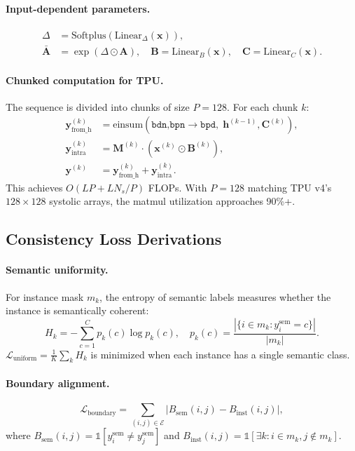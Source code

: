 \documentclass[10pt,twocolumn,letterpaper]{article}
\begin{document}
\paragraph{Input-dependent parameters.}
\begin{align}
\Delta &= \text{Softplus}(\text{Linear}_\Delta(\mathbf{x})), \\
\bar{\mathbf{A}} &= \exp(\Delta \odot \mathbf{A}), \quad \mathbf{B} = \text{Linear}_B(\mathbf{x}), \quad \mathbf{C} = \text{Linear}_C(\mathbf{x}).
\end{align}

\paragraph{Chunked computation for TPU.}
The sequence is divided into chunks of size $P = 128$. For each chunk $k$:
\begin{align}
\mathbf{y}_{\text{from\_h}}^{(k)} &= \text{einsum}(\texttt{bdn,bpn}\to\texttt{bpd},\; \mathbf{h}^{(k-1)}, \mathbf{C}^{(k)}), \\
\mathbf{y}_{\text{intra}}^{(k)} &= \mathbf{M}^{(k)} \cdot (\mathbf{x}^{(k)} \odot \mathbf{B}^{(k)}), \\
\mathbf{y}^{(k)} &= \mathbf{y}_{\text{from\_h}}^{(k)} + \mathbf{y}_{\text{intra}}^{(k)}.
\end{align}
This achieves $O(LP + LN_s/P)$ FLOPs. With $P = 128$ matching TPU v4's $128 \times 128$ systolic arrays, the matmul utilization approaches 90\%+.


\subsection{Consistency Loss Derivations}
\label{sec:supp_consistency}

\paragraph{Semantic uniformity.}
For instance mask $m_k$, the entropy of semantic labels measures whether the instance is semantically coherent:
\begin{equation}
H_k = -\sum_{c=1}^{C} p_k(c) \log p_k(c), \quad p_k(c) = \frac{|\{i \in m_k : y_i^{\text{sem}} = c\}|}{|m_k|}.
\end{equation}
$\mathcal{L}_{\text{uniform}} = \frac{1}{K}\sum_k H_k$ is minimized when each instance has a single semantic class.

\paragraph{Boundary alignment.}
\begin{equation}
\mathcal{L}_{\text{boundary}} = \sum_{(i,j) \in \mathcal{E}} |B_{\text{sem}}(i,j) - B_{\text{inst}}(i,j)|,
\end{equation}
where $B_{\text{sem}}(i,j) = \mathbb{1}[y_i^{\text{sem}} \neq y_j^{\text{sem}}]$ and $B_{\text{inst}}(i,j) = \mathbb{1}[\exists k: i \in m_k, j \notin m_k]$.
\end{document}
